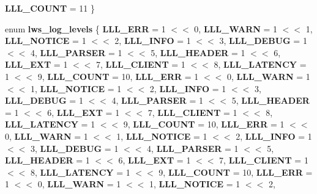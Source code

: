 \begin{DoxyCompactItemize}
{\bfseries L\+L\+L\+\_\+\+C\+O\+U\+NT} = 11
 \}
\item 
\mbox{\label{group__log_ga14542b84d2c76efa7814124bb10f9c5f}} 
enum {\bfseries lws\+\_\+log\+\_\+levels} \{ \newline
{\bfseries L\+L\+L\+\_\+\+E\+RR} = 1 $<$$<$ 0, 
{\bfseries L\+L\+L\+\_\+\+W\+A\+RN} = 1 $<$$<$ 1, 
{\bfseries L\+L\+L\+\_\+\+N\+O\+T\+I\+CE} = 1 $<$$<$ 2, 
{\bfseries L\+L\+L\+\_\+\+I\+N\+FO} = 1 $<$$<$ 3, 
\newline
{\bfseries L\+L\+L\+\_\+\+D\+E\+B\+UG} = 1 $<$$<$ 4, 
{\bfseries L\+L\+L\+\_\+\+P\+A\+R\+S\+ER} = 1 $<$$<$ 5, 
{\bfseries L\+L\+L\+\_\+\+H\+E\+A\+D\+ER} = 1 $<$$<$ 6, 
{\bfseries L\+L\+L\+\_\+\+E\+XT} = 1 $<$$<$ 7, 
\newline
{\bfseries L\+L\+L\+\_\+\+C\+L\+I\+E\+NT} = 1 $<$$<$ 8, 
{\bfseries L\+L\+L\+\_\+\+L\+A\+T\+E\+N\+CY} = 1 $<$$<$ 9, 
{\bfseries L\+L\+L\+\_\+\+C\+O\+U\+NT} = 10, 
{\bfseries L\+L\+L\+\_\+\+E\+RR} = 1 $<$$<$ 0, 
\newline
{\bfseries L\+L\+L\+\_\+\+W\+A\+RN} = 1 $<$$<$ 1, 
{\bfseries L\+L\+L\+\_\+\+N\+O\+T\+I\+CE} = 1 $<$$<$ 2, 
{\bfseries L\+L\+L\+\_\+\+I\+N\+FO} = 1 $<$$<$ 3, 
{\bfseries L\+L\+L\+\_\+\+D\+E\+B\+UG} = 1 $<$$<$ 4, 
\newline
{\bfseries L\+L\+L\+\_\+\+P\+A\+R\+S\+ER} = 1 $<$$<$ 5, 
{\bfseries L\+L\+L\+\_\+\+H\+E\+A\+D\+ER} = 1 $<$$<$ 6, 
{\bfseries L\+L\+L\+\_\+\+E\+XT} = 1 $<$$<$ 7, 
{\bfseries L\+L\+L\+\_\+\+C\+L\+I\+E\+NT} = 1 $<$$<$ 8, 
\newline
{\bfseries L\+L\+L\+\_\+\+L\+A\+T\+E\+N\+CY} = 1 $<$$<$ 9, 
{\bfseries L\+L\+L\+\_\+\+C\+O\+U\+NT} = 10, 
{\bfseries L\+L\+L\+\_\+\+E\+RR} = 1 $<$$<$ 0, 
{\bfseries L\+L\+L\+\_\+\+W\+A\+RN} = 1 $<$$<$ 1, 
\newline
{\bfseries L\+L\+L\+\_\+\+N\+O\+T\+I\+CE} = 1 $<$$<$ 2, 
{\bfseries L\+L\+L\+\_\+\+I\+N\+FO} = 1 $<$$<$ 3, 
{\bfseries L\+L\+L\+\_\+\+D\+E\+B\+UG} = 1 $<$$<$ 4, 
{\bfseries L\+L\+L\+\_\+\+P\+A\+R\+S\+ER} = 1 $<$$<$ 5, 
\newline
{\bfseries L\+L\+L\+\_\+\+H\+E\+A\+D\+ER} = 1 $<$$<$ 6, 
{\bfseries L\+L\+L\+\_\+\+E\+XT} = 1 $<$$<$ 7, 
{\bfseries L\+L\+L\+\_\+\+C\+L\+I\+E\+NT} = 1 $<$$<$ 8, 
{\bfseries L\+L\+L\+\_\+\+L\+A\+T\+E\+N\+CY} = 1 $<$$<$ 9, 
\newline
{\bfseries L\+L\+L\+\_\+\+C\+O\+U\+NT} = 10, 
{\bfseries L\+L\+L\+\_\+\+E\+RR} = 1 $<$$<$ 0, 
{\bfseries L\+L\+L\+\_\+\+W\+A\+RN} = 1 $<$$<$ 1, 
{\bfseries L\+L\+L\+\_\+\+N\+O\+T\+I\+CE} = 1 $<$$<$ 2, 
$$
\end{DoxyCompactItemize}
